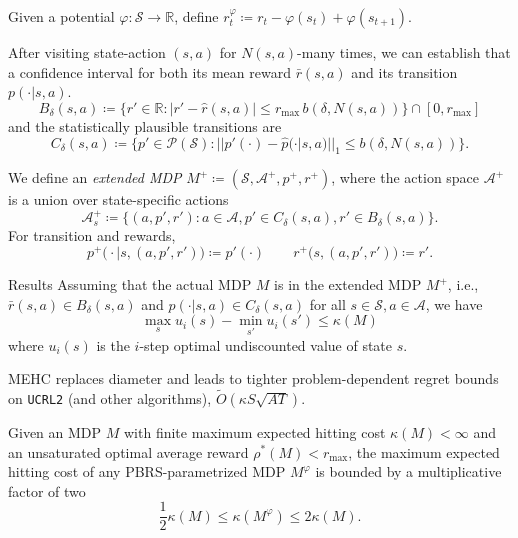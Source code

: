 \documentclass[final]{beamer}
\newlength{\colwidth}
\begin{document}
\begin{frame}[t]
\begin{columns}[t]
\begin{column}{\colwidth}
  Given a potential $\varphi : \mathcal{S} \rightarrow \mathbb{R}$, define $r^\varphi_t \coloneqq r_t -\varphi(s_{t}) + \varphi(s_{t+1})$.

  After visiting state-action $(s, a)$ for $N(s, a)$-many times, we can establish that a confidence interval for both its mean reward $\bar{r}(s, a)$ and its transition $p(\cdot|s, a)$.
  $$ B_\delta(s, a) \coloneqq \big\{r' \in \mathbb{R} : |r' - \hat{r}(s, a)| \leq r_\text{max} \, b(\delta, N(s, a)) \big\} \cap [0, r_\text{max}] $$
  and the statistically plausible transitions are
  $$ C_\delta(s, a) \coloneqq \big\{p' \in \mathcal{P}(\mathcal{S}) : ||p'(\cdot) - \hat{p}(\cdot|s, a)||_1 \leq b(\delta, N(s, a)) \big\}. $$

  We define an \emph{extended MDP} $M^+ \coloneqq (\mathcal{S}, \mathcal{A}^+, p^+, r^+)$, where the action space $\mathcal{A}^+$ is a union over state-specific actions
  $$ \mathcal{A}^+_s \coloneqq \{ (a, p', r') : a \in \mathcal{A}, p' \in C_\delta(s, a), r' \in B_\delta(s, a) \}. $$
  For transition and rewards,
  $$ p^+\big(\cdot|s, (a, p', r') \big) \coloneqq p'(\cdot) \qquad r^+\big(s, (a, p', r')\big) \coloneqq r'. $$

  \begin{block}{Results}
  Assuming that the actual MDP $M$ is in the extended MDP $M^+$, i.e., $\bar{r}(s, a) \in B_\delta(s, a)$ and $p(\cdot|s, a) \in C_\delta(s, a)$ for all $s \in \mathcal{S}, a \in \mathcal{A}$, we have
  $$ \max_s u_i(s) - \min_{s'} u_i(s') \leq \kappa(M) $$
  where $u_i(s)$ is the $i$-step optimal undiscounted value of state $s$.

  MEHC replaces diameter and leads to tighter problem-dependent regret bounds on \texttt{UCRL2} (and other algorithms), $\widetilde{O}(\kappa S \sqrt{A T})$.

  Given an MDP $M$ with finite maximum expected hitting cost $\kappa(M) < \infty$ and an unsaturated optimal average reward $\rho^*(M) < r_\text{max}$, the maximum expected hitting cost of any PBRS-parametrized MDP $M^\varphi$ is bounded by a multiplicative factor of two
  $$ \frac{1}{2} \kappa(M) \leq \kappa(M^\varphi) \leq 2 \kappa(M). $$


\end{block}
\end{column}
\end{columns}
\end{frame}
\end{document}
